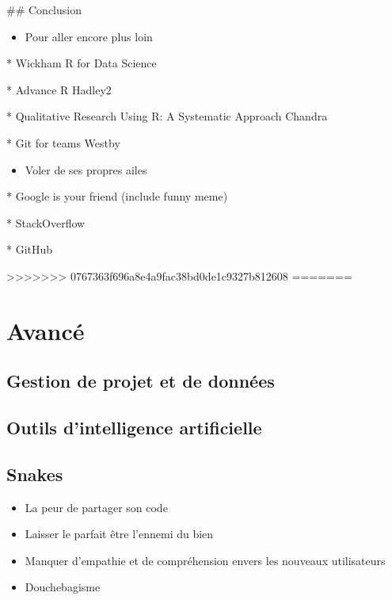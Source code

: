 \documentclass[
  letterpaper,
]{scrbook}
\providecommand{\tightlist}{%
  \setlength{\itemsep}{0pt}\setlength{\parskip}{0pt}}\usepackage{longtable,booktabs,array}
\begin{document}
\#\# Conclusion

\begin{itemize}
\tightlist
\item
  Pour aller encore plus loin
\end{itemize}

* Wickham R for Data Science

* Advance R Hadley2

* Qualitative Research Using R: A Systematic Approach Chandra

* Git for teams Westby

\begin{itemize}
\tightlist
\item
  Voler de ses propres ailes
\end{itemize}

* Google is your friend (include funny meme)

* StackOverflow

* GitHub

\textgreater\textgreater\textgreater\textgreater\textgreater\textgreater\textgreater{}
0767363f696a8e4a9fac38bd0de1c9327b812608
=======
\hypertarget{avancuxe9}{%
\section{Avancé}\label{avancuxe9}}

\hypertarget{gestion-de-projet-et-de-donnuxe9es}{%
\subsection{Gestion de projet et de
données}\label{gestion-de-projet-et-de-donnuxe9es}}

\hypertarget{outils-dintelligence-artificielle-1}{%
\subsection{Outils d'intelligence
artificielle}\label{outils-dintelligence-artificielle-1}}

\hypertarget{snakes}{%
\subsection{Snakes}\label{snakes}}

\begin{itemize}
\item
  La peur de partager son code
\item
  Laisser le parfait être l'ennemi du bien
\item
  Manquer d'empathie et de compréhension envers les nouveaux
  utilisateurs
\item
  Douchebagisme
\end{itemize}
\end{document}
